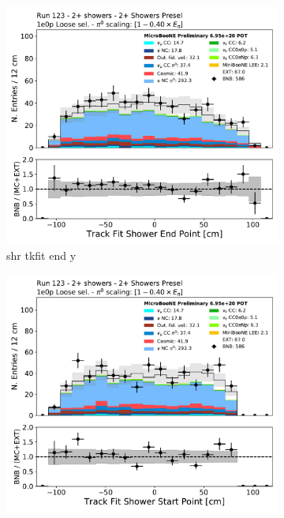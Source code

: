 \begin{figure}[H]
    \centering
    \begin{subfigure}{0.3\textwidth}
    \includegraphics[width=1.0\textwidth]{Sidebands/Figures/TwoShr_1e0pSel/loose/shr_trk_sce_end_y.pdf}
    \caption{shr tkfit end y}
    \end{subfigure}
    \begin{subfigure}{0.3\textwidth}
    \includegraphics[width=1.0\textwidth]{Sidebands/Figures/TwoShr_1e0pSel/loose/shr_trk_sce_start_y.pdf}

\end{subfigure}
\end{figure}
